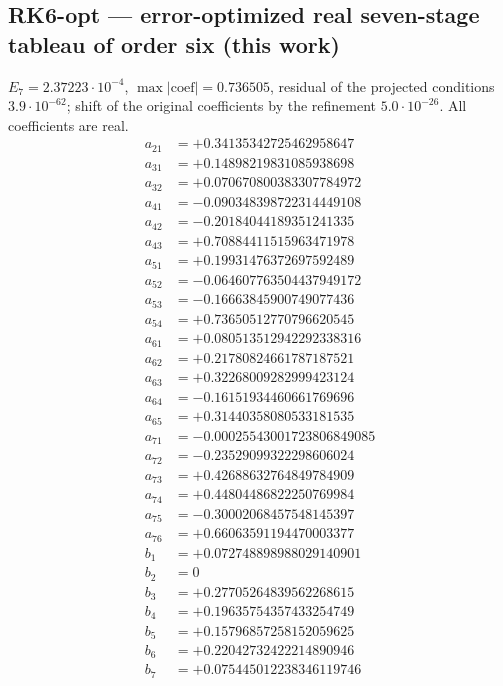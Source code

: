 \subsection*{RK6-opt --- error-optimized real seven-stage tableau of order six (this work)}
$E_{7}=2.37223\cdot10^{-4}$, $\max|\text{coef}|=0.736505$, residual of the projected conditions $3.9\cdot10^{-62}$; shift of the original coefficients by the refinement $5.0\cdot10^{-26}$. All coefficients are real.
{\small\allowdisplaybreaks
\begin{align*}
a_{21} &= +0.34135342725462958647\\
a_{31} &= +0.14898219831085938698\\
a_{32} &= +0.070670800383307784972\\
a_{41} &= -0.090348398722314449108\\
a_{42} &= -0.20184044189351241335\\
a_{43} &= +0.70884411515963471978\\
a_{51} &= +0.19931476372697592489\\
a_{52} &= -0.064607763504437949172\\
a_{53} &= -0.16663845900749077436\\
a_{54} &= +0.73650512770796620545\\
a_{61} &= +0.080513512942292338316\\
a_{62} &= +0.21780824661787187521\\
a_{63} &= +0.32268009282999423124\\
a_{64} &= -0.16151934460661769696\\
a_{65} &= +0.31440358080533181535\\
a_{71} &= -0.00025543001723806849085\\
a_{72} &= -0.23529099322298606024\\
a_{73} &= +0.42688632764849784909\\
a_{74} &= +0.44804486822250769984\\
a_{75} &= -0.30002068457548145397\\
a_{76} &= +0.66063591194470003377\\[1mm]
b_{1} &= +0.072748898988029140901\\
b_{2} &= 0\\
b_{3} &= +0.27705264839562268615\\
b_{4} &= +0.19635754357433254749\\
b_{5} &= +0.15796857258152059625\\
b_{6} &= +0.22042732422214890946\\
b_{7} &= +0.075445012238346119746\\[1mm]

\end{align*}}
